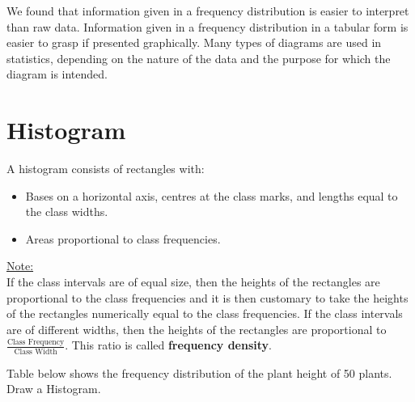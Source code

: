 \documentclass[
]{book}
\begin{document}
We found that information given in a frequency distribution is easier to
interpret than raw data. Information given in a frequency distribution
in a tabular form is easier to grasp if presented graphically. Many
types of diagrams are used in statistics, depending on the nature of the
data and the purpose for which the diagram is intended.

\section{Histogram}\label{histogram}

A histogram consists of rectangles with:

\begin{itemize}
\item
  Bases on a horizontal axis, centres at the class marks, and lengths
  equal to the class widths.
\item
  Areas proportional to class frequencies.
\end{itemize}

\ul{Note:}\\
If the class intervals are of equal size, then the heights of the
rectangles are proportional to the class frequencies and it is then
customary to take the heights of the rectangles numerically equal to the
class frequencies. If the class intervals are of different widths, then
the heights of the rectangles are proportional to
\(\frac{\text{Class Frequency}}{\text{Class Width}}\). This ratio is
called \textbf{frequency density}.

Table below shows the frequency distribution of the plant height of 50 plants. Draw a Histogram.
\end{document}
